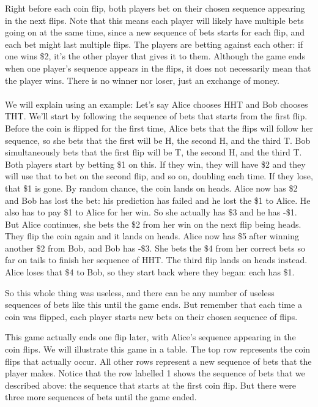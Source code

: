\documentclass[english,12pt,a4paper,final]{article}
\begin{document}
Right before each coin flip, both players bet on their chosen sequence appearing in the next flips. Note that this means each player will likely have multiple bets going on at the same time, since a new sequence of bets starts for each flip, and each bet might last multiple flips. The players are betting against each other: if one wins \$2, it's the other player that gives it to them. Although the game ends when one player's sequence appears in the flips, it does not necessarily mean that the player wins. There is no winner nor loser, just an exchange of money.
\\\\
We will explain using an example: Let's say Alice chooses HHT and Bob chooses THT. We'll start by following the sequence of bets that starts from the first flip. Before the coin is flipped for the first time, Alice bets that the flips will follow her sequence, so she bets that the first will be H, the second H, and the third T. Bob simultaneously bets that the first flip will be T, the second H, and the third T. Both players start by betting \$1 on this. If they win, they will have \$2 and they will use that to bet on the second flip, and so on, doubling each time. If they lose, that \$1 is gone. By random chance, the coin lands on heads. Alice now has \$2 and Bob has lost the bet: his prediction has failed and he lost the \$1 to Alice. He also has to pay \$1 to Alice for her win. So she actually has \$3 and he has -\$1. But Alice continues, she bets the \$2 from her win on the next flip being heads. They flip the coin again and it lands on heads. Alice  now has \$5 after winning another \$2 from Bob, and Bob has -\$3. She bets the \$4 from her correct bets so far on tails to finish her sequence of HHT. The third flip lands on heads instead. Alice loses that \$4 to Bob, so they start back where they began: each has \$1.

So this whole thing was useless, and there can be any number of useless sequences of bets like this until the game ends. But remember that each time a coin was flipped, each player starts new bets on their chosen sequence of flips.

This game actually ends one flip later, with Alice's sequence appearing in the coin flips. We will illustrate this game in a table. The top row represents the coin flips that actually occur. All other rows represent a new sequence of bets that the player makes. Notice that the row labelled 1 shows the sequence of bets that we described above: the sequence that starts at the first coin flip. But there were three more sequences of bets until the game ended.
\end{document}

